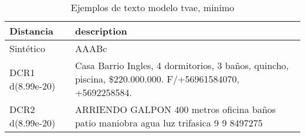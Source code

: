 \begin{table}[H]
\centering
\fontsize{10}{14}\selectfont
\caption{Ejemplos de texto modelo tvae, minimo}
\label{table-example-economicos-b-3-tvae-min-text}
\begin{tabular}{|l|m{35em}|}
\hline
\rowcolor[gray]{0.8}
Distancia & description \\
\hline Sintético & AAABc \\
\hline DCR1 d(8.99e-20) & Casa Barrio Ingles, 4 dormitorios, 3 ba\~nos, quincho, piscina, \$220.000.000. F/+56961584070, +5692258584. \\
\hline DCR2 d(8.99e-20) & ARRIENDO GALPON 400 metros oficina ba\~nos patio maniobra agua luz trifasica 9 9 8497275 \\
\hline
\end{tabular}
\end{table}
